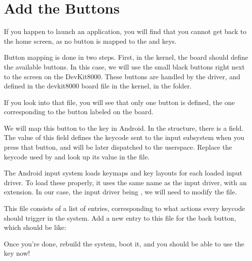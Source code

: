 \section{Add the Buttons}

If you happen to launch an application, you will find that you cannot
get back to the home screen, as no button is mapped to the 
and  keys.

Button mapping is done in two steps. First, in the kernel, the board
should define the available buttons. In this case, we will use the
small black buttons right next to the screen on the DevKit8000. These
buttons are handled by the  driver, and defined in the
devkit8000 board file in the kernel, in the 
folder.

If you look into that file, you will see that only one button is
defined, the one corresponding to the button labeled 
on the board.

We will map this button to the  key in Android. In the
 structure, there is a  field. The
value of this field defines the keycode sent to the input subsystem
when you press that button, and will be later dispatched to the
userspace. Replace the keycode used by  and look up its
value in the  file.

The Android input system loads keymaps and key layouts for each loaded
input driver. To load these properly, it uses the same name as the
input driver, with an extension. In our case, the input driver being
, we will need to modify the  file.

This file consists of a list of entries, corresponding to what actions
every keycode should trigger in the system. Add a new entry to this
file for the back button, which should be like:

Once you're done, rebuild the system, boot it, and you should be able
to use the  key now!
